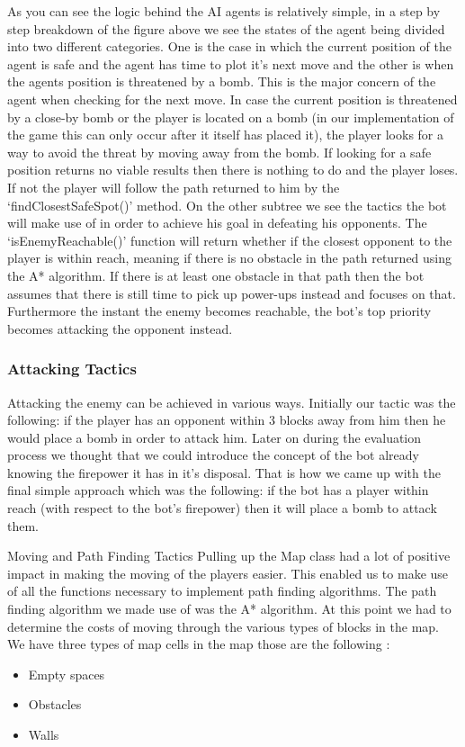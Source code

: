 As you can see the logic behind the AI agents is relatively simple, in a step by step breakdown of the figure above we see the states of the agent being divided into two different categories. One is the case in which the current position of the agent is safe and the agent has time to plot it’s  next move and the other is when the agents position is threatened by a bomb. This is the major concern of the agent when checking for the next move. 
In case the current position is threatened by a close-by bomb or the player is located on a bomb (in our implementation of the game this can only occur after it itself has placed it), the player looks for a way to avoid the threat by moving away from the bomb. If looking for a safe position returns no viable results then there is nothing to do and the player loses. If not the player will follow the path returned to him by the ‘findClosestSafeSpot()’ method.
On the other subtree we see the tactics the bot will make use of in order to achieve his goal in defeating his opponents. The ‘isEnemyReachable()’ function will return whether if the closest opponent to the player is within reach, meaning if there is no obstacle in the path returned using the A* algorithm. If there is at least one obstacle in that path then the bot assumes that there is still time to pick up power-ups instead and focuses on that. Furthermore the instant the enemy becomes reachable, the bot’s top priority becomes attacking the opponent instead.


\subsubsection{Attacking Tactics}
Attacking the enemy can be achieved in various ways. Initially our tactic was the following: if the player has an opponent within 3 blocks away from him then he would place a bomb in order to attack him. Later on during the evaluation process we thought that we could introduce the concept of the bot already knowing the firepower it has in it’s disposal. That is how we came up with the final simple approach which was the following: if the bot has a player within reach (with respect to the bot’s firepower) then it will place a bomb to attack them.

Moving and Path Finding Tactics
Pulling up the Map class had a lot of positive impact in making the moving of the players easier. This enabled us to make use of all the functions necessary to implement path finding algorithms. The path finding algorithm we made use of was the A* algorithm. At this point we had to determine the costs of moving through the various types of blocks in the map. We have three types of map cells in the map those are the following :
\begin{itemize}
\item Empty spaces
\item Obstacles
\item Walls
\end{itemize}

